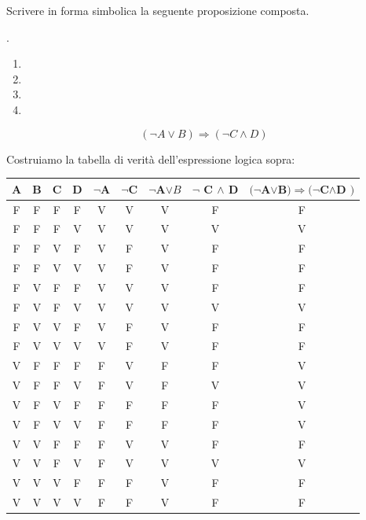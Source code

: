 \begin{esercizio}
Scrivere in forma simbolica la seguente proposizione composta. 
\begin{center}
    . 
\end{center}
\end{esercizio}
    
\begin{soluzione}
\begin{enumerate}
    \item[$A$:] 
    \item[$B$:] 
    \item[$C$:] 
    \item[$D$:] 
\end{enumerate}
$$(\neg A \vee B) \Rightarrow (\neg C \wedge D)$$

\noindent Costruiamo la tabella di verità dell'espressione logica sopra:
	\begin{center}
		\begin{tabular}{ | c | c | c | c | c | c | c | c | c |}
			\hline 
			A & B & C & D &  $\neg$A & $\neg$C & $\neg$A$\vee B$ & $\neg$ C $\wedge$ D &  $(\neg $A$ \vee $B$) \Rightarrow (\neg $C$ \wedge $D $)$  \\
			\hline 
			F & F & F & F &	V & V & V & F & F \\
			\hline
			F & F & F & V & V & V & V & V & V\\
			\hline
			F & F & V & F & V & F & V & F & F \\
			\hline
			F & F & V & V & V & F & V  & F & F\\
			\hline
			F & V & F & F &	 V &	V	& V & F & F\\
			\hline
			F & V & F & V & V & V & V & V & V\\
			\hline
			F & V & V & F & V &	F & V & F & F \\
			\hline
			F & V & V & V & V &	F & V & F & F \\
			\hline
			V & F & F & F & F & V & F & F & V\\
			\hline
			V & F & F & V & F & V & F & V & V\\
			\hline
			V & F & V & F & F & F & F & F & V\\
			\hline
			V & F & V & V & F & F & F & F & V\\
			\hline
			V & V & F & F & F & V & V & F & F\\
			\hline
			V & V & F & V & F & V & V & V & V\\
			\hline
			V & V & V & F & F & F & V & F & F\\
			\hline
			V & V & V & V & F & F & V & F & F\\
			\hline
		\end{tabular}
	\end{center}
\end{soluzione}

